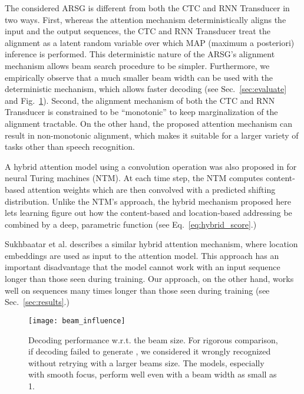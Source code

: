 \documentclass{article}
\begin{document}
The considered ARSG is different from both the CTC and RNN Transducer in two
ways.  First, whereas the attention mechanism deterministically aligns the input
and the output sequences, the CTC and RNN Transducer treat the alignment as a
latent random variable over which MAP (maximum a posteriori) inference is
performed. This deterministic nature of the ARSG's alignment mechanism allows
beam search procedure to be simpler. Furthermore, we empirically observe that a
much smaller beam width can be used with the deterministic mechanism, which
allows faster decoding (see Sec.~\ref{sec:evaluate} and
Fig.~\ref{fig:beam_dependency}).
Second, the alignment mechanism of both the CTC and RNN Transducer is
constrained to be ``monotonic'' to keep marginalization of the alignment
tractable. On the other hand, the proposed attention mechanism can result in
non-monotonic alignment, which makes it suitable for a larger variety of tasks
other than speech recognition.

A hybrid attention model using a convolution operation was also proposed in
\cite{graves_2014} for neural Turing machines (NTM). At each time step, the NTM
computes content-based attention weights which are then convolved with a
predicted shifting distribution. Unlike the NTM's approach, the hybrid mechanism
proposed here lets learning figure out how the content-based and location-based
addressing be combined by a deep, parametric function (see
Eq.~\eqref{eq:hybrid_score}.) 


Sukhbaatar et al. \cite{sukhbaatar_2015} describes a similar hybrid attention
mechanism, where location embeddings are used as input to the attention model.
This approach has an important disadvantage that the model cannot work with an
input sequence longer than those seen during training. Our approach, on the
other hand, works well on sequences many times longer than those seen during
training (see Sec.~\ref{sec:results}.)











\begin{figure}[t]
  \centering
  \texttt{[image: beam\_influence]}
\caption{Decoding performance w.r.t. the beam size.
For rigorous comparison, if decoding failed to generate
      , we considered it wrongly recognized without
      retrying with a larger beams size. The models, especially with smooth focus, 
      perform well even
      with a beam width as small as 1.
}
  \label{fig:beam_dependency}

  \vspace{-4mm}
\end{figure}
\end{document}
